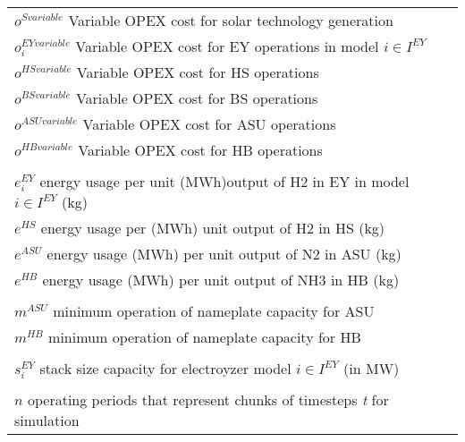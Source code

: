 \documentclass[12 pt]{article}
\begin{document}
\begin{tabular}{ll}
$o^{S variable}$ Variable OPEX cost for solar  technology generation \\
$o^{EY variable}_{i}$ Variable OPEX cost for EY operations in model $i \in I^{EY}$\\
$o^{HS variable}$ Variable OPEX cost for HS operations \\
$o^{BS variable}$ Variable OPEX cost for BS operations \\
$o^{ASU variable}$ Variable OPEX cost for ASU operations \\
$o^{HB variable}$ Variable OPEX cost for HB operations \\
\\
$e^{EY}_{i}$ energy usage per unit (MWh)output of H2 in EY in model $i \in I^{EY}$ (kg)\\
$e^{HS}$ energy usage per (MWh) unit output of H2 in HS (kg) \\
$e^{ASU}$ energy usage (MWh) per unit output of N2 in ASU (kg)\\
$e^{HB}$ energy usage (MWh) per unit output of NH3 in HB (kg) \\
\\
$m^{ASU}$ minimum operation of nameplate capacity for ASU\\
$m^{HB}$ minimum operation of nameplate capacity for HB\\
\\
$s^{EY}_{i}$ stack size capacity for electroyzer model $i \in I^{EY}$ (in MW)\\
\\
$n$ operating periods that represent chunks of timesteps \textit{t} for simulation \\

\end{tabular} 
\end{document}
